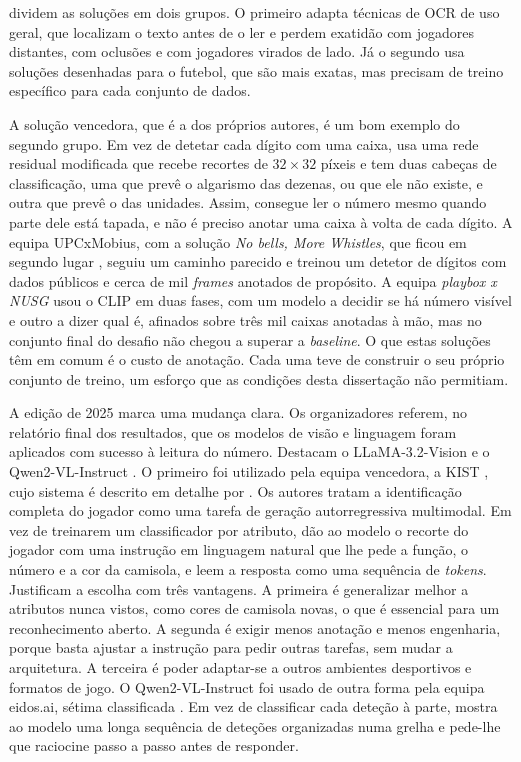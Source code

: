 \citet{golovkin2025minimap} dividem as soluções em dois grupos. O primeiro adapta técnicas de OCR de uso geral, que localizam o texto antes de o ler e perdem exatidão com jogadores distantes, com oclusões e com jogadores virados de lado. Já o segundo usa soluções desenhadas para o futebol, que são mais exatas, mas precisam de treino específico para cada conjunto de dados.

A solução vencedora, que é a dos próprios autores, é um bom exemplo do segundo grupo. Em vez de detetar cada dígito com uma caixa, usa uma rede residual modificada que recebe recortes de $32\times32$ píxeis e tem duas cabeças de classificação, uma que prevê o algarismo das dezenas, ou que ele não existe, e outra que prevê o das unidades. Assim, consegue ler o número mesmo quando parte dele está tapada, e não é preciso anotar uma caixa à volta de cada dígito. A equipa UPCxMobius, com a solução \emph{No bells, More Whistles}, que ficou em segundo lugar \citep[equipa GSR-2]{cioppa2024soccernet}, seguiu um caminho parecido e treinou um detetor de dígitos com dados públicos e cerca de mil \emph{frames} anotados de propósito. A equipa \emph{playbox x NUSG} \citep[equipa GSR-14]{cioppa2024soccernet} usou o CLIP em duas fases, com um modelo a decidir se há número visível e outro a dizer qual é, afinados sobre três mil caixas anotadas à mão, mas no conjunto final do desafio não chegou a superar a \emph{baseline}. O que estas soluções têm em comum é o custo de anotação. Cada uma teve de construir o seu próprio conjunto de treino, um esforço que as condições desta dissertação não permitiam.

A edição de 2025 marca uma mudança clara. Os organizadores referem, no relatório final dos resultados, que os modelos de visão e linguagem foram aplicados com sucesso à leitura do número. Destacam o LLaMA-3.2-Vision \citep{grattafiori2024llama3} e o Qwen2-VL-Instruct \citep{wang2024qwen2vl}. O primeiro foi utilizado pela equipa vencedora, a KIST \citep[equipa GSR-1]{giancola2025soccernet}, cujo sistema é descrito em detalhe por \citet{oo2026broadcast2pitch}. Os autores tratam a identificação completa do jogador como uma tarefa de geração autorregressiva multimodal. Em vez de treinarem um classificador por atributo, dão ao modelo o recorte do jogador com uma instrução em linguagem natural que lhe pede a função, o número e a cor da camisola, e leem a resposta como uma sequência de \emph{tokens}. Justificam a escolha com três vantagens. A primeira é generalizar melhor a atributos nunca vistos, como cores de camisola novas, o que é essencial para um reconhecimento aberto. A segunda é exigir menos anotação e menos engenharia, porque basta ajustar a instrução para pedir outras tarefas, sem mudar a arquitetura. A terceira é poder adaptar-se a outros ambientes desportivos e formatos de jogo. O Qwen2-VL-Instruct foi usado de outra forma pela equipa eidos.ai, sétima classificada \citep[equipa GSR-7]{giancola2025soccernet}. Em vez de classificar cada deteção à parte, mostra ao modelo uma longa sequência de deteções organizadas numa grelha e pede-lhe que raciocine passo a passo antes de responder.

